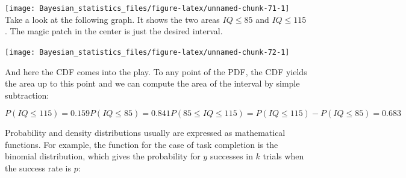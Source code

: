 \documentclass[]{svmono}
\newenvironment{Shaded}{\begin{snugshade}}{\end{snugshade}}
\newcommand{\KeywordTok}[1]{\textcolor[rgb]{0.13,0.29,0.53}{\textbf{#1}}}
\newcommand{\DataTypeTok}[1]{\textcolor[rgb]{0.13,0.29,0.53}{#1}}
\newcommand{\DecValTok}[1]{\textcolor[rgb]{0.00,0.00,0.81}{#1}}
\newcommand{\StringTok}[1]{\textcolor[rgb]{0.31,0.60,0.02}{#1}}
\newcommand{\OperatorTok}[1]{\textcolor[rgb]{0.81,0.36,0.00}{\textbf{#1}}}
\newcommand{\NormalTok}[1]{#1}
\begin{document}
\begin{Shaded}
\end{Shaded}

\texttt{[image: Bayesian\_statistics\_files/figure-latex/unnamed-chunk-71-1]}
Take a look at the following graph. It shows the two areas
\(IQ \leq 85\) and \(IQ \leq 115\). The magic patch in the center is
just the desired interval.

\begin{Shaded}
\end{Shaded}

\texttt{[image: Bayesian\_statistics\_files/figure-latex/unnamed-chunk-72-1]}

And here the CDF comes into the play. To any point of the PDF, the CDF
yields the area up to this point and we can compute the area of the
interval by simple subtraction:

\[
P(IQ \leq 115) = 0.159
P(IQ \leq 85) = 0.841
P(85 \leq IQ \leq 115) = P(IQ \leq 115) - P(IQ \leq 85) = 0.683
\]

Probability and density distributions usually are expressed as
mathematical functions. For example, the function for the case of task
completion is the binomial distribution, which gives the probability for
\(y\) successes in \(k\) trials when the success rate is \(p\):
\end{document}
